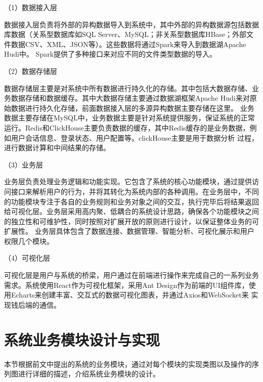 （1）数据接入层

数据接入层负责将外部的异构数据导入到系统中，其中外部的异构数据源包括数据库数据（关系型数据库如SQL Server、MySQL；非关系型数据库HBase；外部文件数据CSV、XML、JSON等）。这些数据将通过Spark来导入到数据湖Apache Hudi中。
Spark提供了多种接口来对应不同的文件类型数据的导入。

（2）数据存储层

数据存储层主要是对系统中所有数据进行持久化的存储。其中包括大数据存储、业务数据存储和数据缓存。其中大数据存储主要通过数据湖框架Apache Hudi来对原始数据进行持久化存储，前面数据接入层的多源异构数据主要存储在这里。
业务数据主要存储在MySQL中，业务数据主要是针对系统提供服务，保证系统的正常运行。Redis和ClickHouse主要负责数据的缓存，其中Redis缓存的是业务数据，例如用户会话信息、登录状态、用户配置等。clickHouse主要是用于数据分析
过程，进行数据计算和中间结果的存储。

（3）业务层 

业务层负责处理业务逻辑和功能实现。它包含了系统的核心功能模块，通过提供访问接口来解析用户的行为，并将其转化为系统内部的各种调用。在业务层中，不同的功能模块专注于各自的业务规则和业务对象之间的交互，执行完毕后将结果返回给可视化层。业务层采用高内聚、低耦合的系统设计思路，确保各个功能模块之间的独立性和可维护性，同时按照对扩展开放的原则进行设计，以保证整体业务的可扩展性。
业务层具体包含了数据连接、数据管理、智能分析、可视化展示和用户权限几个模块。

（4）可视化层

可视化层是用户与系统的桥梁，用户通过在前端进行操作来完成自己的一系列业务需求。系统使用React作为可视化框架，采用Ant Design作为前端的UI组件库，使用Echarts来创建丰富、交互式的数据可视化图表，并通过Axios和WebSocket来
实现钱后端的通信。

\section{系统业务模块设计与实现}
本节根据前文中提出的系统的业务模块，通过对每个模块的实现类图以及操作的序列图进行详细的描述，介绍系统业务模块的设计。
